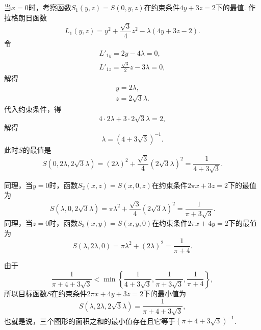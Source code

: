 \begin{example}
\begin{solution}
当\(x=0\)时，考察函数\(S_1(y,z) = S(0,y,z)\)在约束条件\(4 y + 3 z = 2\)下的最值.
作拉格朗日函数\begin{equation*}
	L_1(y,z) = y^2 + \frac{\sqrt3}4 z^2 - \lambda(4 y + 3 z - 2).
\end{equation*}
令\begin{gather*}
	L'_{1y} = 2y - 4\lambda = 0, \\
	L'_{1z} = \frac{\sqrt3}2 z - 3\lambda = 0,
\end{gather*}
解得\begin{gather*}
	y = 2\lambda, \\
	z = 2\sqrt3 \lambda.
\end{gather*}
代入约束条件，得\begin{equation*}
	4 \cdot 2\lambda + 3 \cdot 2\sqrt3 \lambda = 2,
\end{equation*}
解得\begin{equation*}
	\lambda = (4+3\sqrt3)^{-1}.
\end{equation*}
此时\(S\)的最值是\begin{equation*}
	S(0,2\lambda,2\sqrt3 \lambda)
	= (2\lambda)^2 + \frac{\sqrt3}4 (2\sqrt3 \lambda)^2
	= \frac1{4+3\sqrt3}.
\end{equation*}

同理，当\(y=0\)时，函数\(S_2(x,z) = S(x,0,z)\)在约束条件\(2\pi x + 3 z = 2\)下的最值为\begin{equation*}
	S(\lambda,0,2\sqrt3 \lambda)
	= \pi \lambda^2 + \frac{\sqrt3}4 (2\sqrt3 \lambda)^2
	= \frac1{\pi+3\sqrt3}.
\end{equation*}
同理，当\(z=0\)时，函数\(S_3(x,y) = S(x,y,0)\)在约束条件\(2\pi x + 4 y = 2\)下的最值为\begin{equation*}
	S(\lambda,2\lambda,0)
	= \pi \lambda^2 + (2\lambda)^2
	= \frac1{\pi+4}.
\end{equation*}

由于\begin{equation*}
	\frac1{\pi+4+3\sqrt3}
	< \min\left\{
		\frac1{4+3\sqrt3},
		\frac1{\pi+3\sqrt3},
		\frac1{\pi+4}
	\right\},
\end{equation*}
所以目标函数\(S\)在约束条件\(2\pi x + 4 y + 3 z = 2\)下的最小值为\begin{equation*}
	S(\lambda,2\lambda,2\sqrt3 \lambda)
	= \frac1{\pi+4+3\sqrt3},
\end{equation*}
也就是说，三个图形的面积之和的最小值存在且它等于\((\pi+4+3\sqrt3)^{-1}\).
\end{solution}
\end{example}
